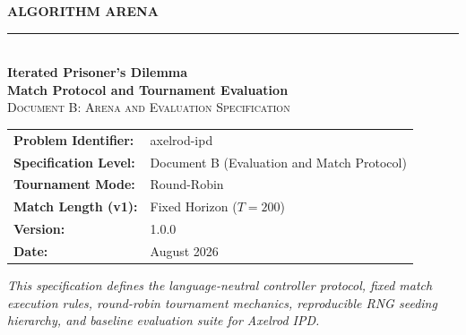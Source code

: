 \documentclass[11pt,a4paper]{article}
\newcommand{\shortname}{axelrod-ipd}
\newcommand{\problemversion}{1.0.0}
\newcommand{\problemdate}{August 2026}
\begin{document}
\hypersetup{pageanchor=false}
\begin{titlepage}

    \centering
    \vspace*{1.0cm}

    {\Large\textbf{\color{arenaBlue}ALGORITHM ARENA}}\\[0.4cm]
    {\color{codegray!60}\rule{0.5\textwidth}{0.8pt}}\\[1.2cm]

    {\fontsize{26}{34}\selectfont\textbf{Iterated Prisoner's Dilemma}}\\[0.4cm]
    {\Large\color{arenaBlue}\textbf{Match Protocol and Tournament Evaluation}}\\[1.2cm]

    {\large\textsc{Document B: Arena and Evaluation Specification}}\\[1.5cm]

    \begin{tabular}{ll}
        \toprule
        \textbf{Problem Identifier:} & \shortname \\
        \textbf{Specification Level:}& Document B (Evaluation and Match Protocol) \\
        \textbf{Tournament Mode:}    & Round-Robin \\
        \textbf{Match Length (v1):}  & Fixed Horizon ($T = 200$) \\
        \textbf{Version:}            & \problemversion \\
        \textbf{Date:}               & \problemdate \\
        \bottomrule
    \end{tabular}

    \vfill

    \parbox{0.85\textwidth}{
        \centering\textit{
            This specification defines the language-neutral controller protocol,
            fixed match execution rules, round-robin tournament mechanics,
            reproducible RNG seeding hierarchy, and baseline evaluation suite for Axelrod IPD.
        }
    }

\end{titlepage}
\hypersetup{pageanchor=true}

\tableofcontents
\newpage
{}
\end{document}
